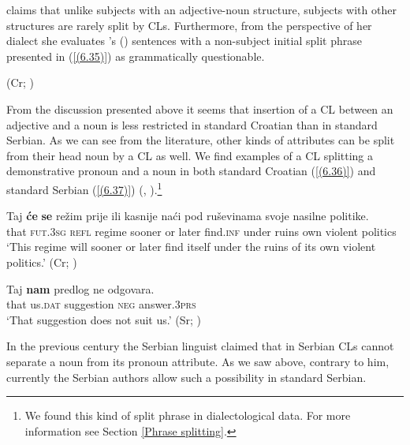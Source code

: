\noindent \citet[114]{RadanovicKocic88} claims that unlike subjects with an adjective-noun structure, subjects with other structures are rarely split by CLs. Furthermore, from the perspective of her dialect she evaluates \citeauthor{Katicic86}'s (\citeyear{Katicic86}) sentences with a non-subject initial split phrase presented in (\ref{(6.35)}) as grammatically questionable. 

\begin{exe}
\strut\hfill  (Cr; \citealt[111]{RadanovicKocic88})
\end{exe}

\noindent From the discussion presented above it seems that insertion of a CL between an adjective and a noun is less restricted in standard Croatian than in standard Serbian. 
As we can see from the literature, other kinds of attributes can be split from their head noun by a CL as well. We find examples of a CL splitting a demonstrative pronoun and a noun in both standard Croatian (\ref{(6.36)}) and standard Serbian (\ref{(6.37)}) (\citealt[cf.][597]{Baric97}, \citealt[450]{PiperKlajn14}).\footnote{We found this kind of split phrase in dialectological data. For more information see Section \ref{Phrase splitting}.}


\begin{exe}\ex\label{(6.36)}
\gll Taj \textbf{će} \textbf{se} režim prije ili kasnije naći pod ruševinama svoje nasilne politike. \\
 that \textsc{fut.3sg} \textsc{refl} regime sooner or later find\textsc{.inf} under ruins own violent politics \\
\glt `This regime will sooner or later find itself under the ruins of its own violent politics.' 
\hfill (Cr; \citealt[597]{Baric97})

\ex\label{(6.37)}
\gll Taj \textbf{nam} predlog ne odgovara.\\
 that us.\textsc{dat} suggestion \textsc{neg} answer\textsc{.3prs} \\
\glt ‘That suggestion does not suit us.’ 
\hfill  (Sr; \citealt[450]{PiperKlajn14})
\end{exe}

\noindent In the previous century the Serbian linguist \citet[306f]{Pesikan58} claimed that in Serbian CLs cannot separate a noun from its pronoun attribute. As we saw above, contrary to him, currently the Serbian authors \citet[450]{PiperKlajn14} allow such a possibility in standard Serbian.

